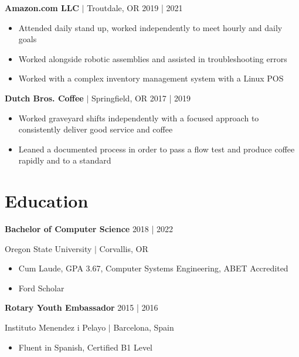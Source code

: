 \documentclass{article}
\begin{document}
	\noindent \textbf{Amazon.com LLC} $\vert$ Troutdale, OR
	{\hfill 2019 | 2021}
	\begin{itemize}
		\item Attended daily stand up, worked independently to meet hourly and daily goals
		\item Worked alongside robotic assemblies and assisted in troubleshooting errors
		\item Worked with a complex inventory management system with a Linux POS
	\end{itemize}

	\noindent \textbf{Dutch Bros. Coffee} $\vert$ Springfield, OR
	{\hfill 2017 | 2019}
	\begin{itemize}
		\item Worked graveyard shifts independently with a focused approach to consistently deliver good service and coffee
		\item Leaned a documented process in order to pass a flow test and produce coffee rapidly and to a standard
	\end{itemize}


	\section*{Education}

	\noindent \textbf{Bachelor of Computer Science}
	{\hfill 2018 | 2022}

	\noindent Oregon State University $\vert$ Corvallis, OR

    \begin{itemize}
		\item Cum Laude, GPA 3.67, Computer Systems Engineering, ABET Accredited
		\item Ford Scholar
	\end{itemize}

	\noindent \textbf{Rotary Youth Embassador}
	{\hfill 2015 | 2016}

	\noindent Instituto Menendez i Pelayo $\vert$ Barcelona, Spain

	\begin{itemize}
		\item Fluent in Spanish, Certified B1 Level
	\end{itemize}
	
\end{document}
